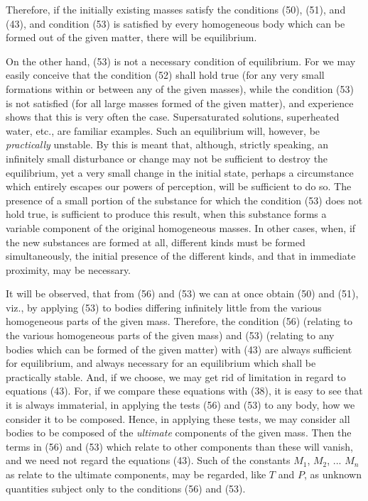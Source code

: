 \documentclass[12pt]{article}
\begin{document}
Therefore, if the initially existing masses satisfy the conditions (50),
(51), and (43), and condition (53) is satisfied by every homogeneous body which can be formed out of the given matter, there will be equilibrium.


On the other hand, (53) is not a necessary condition of equilibrium.
For we may easily conceive that the condition (52) shall hold true (for any very small formations within or between any of the given masses), while the condition (53) is not satisfied (for all large masses formed of the given matter), and experience shows that this is very often the case. Supersaturated solutions, superheated water, etc., are familiar examples. Such an equilibrium will, however, be \textit{practically} unstable. By this is meant that, although, strictly speaking, an infinitely small disturbance or change may not be sufficient to destroy the equilibrium, yet a very small change in the initial state, perhaps a circumstance which entirely escapes our powers of perception, will be sufficient to do so. The presence of a small portion of the substance for which the condition (53) does not hold true, is sufficient to produce this result, when this substance forms a variable component of the original homogeneous masses. In other cases, when, if the new substances are formed at all, different kinds must be formed simultaneously, the initial presence of the different kinds, and that in immediate proximity, may be necessary.


It will be observed, that from (56) and (53) we can at once obtain (50) and (51), viz., by applying (53) to bodies differing infinitely little from the various homogeneous parts of the given mass. Therefore, the condition (56) (relating to the various homogeneous parts of the given mass) and (53) (relating to any bodies which can be formed of the given matter) with (43) are always sufficient for equilibrium, and always necessary for an equilibrium which shall be practically stable. And, if we choose, we may get rid of limitation in regard to equations (43). For, if we compare these equations with (38), it is easy to see that it is always immaterial, in applying the tests (56) and (53) to any body, how we consider it to be composed. Hence, in applying these tests, we may consider all bodies to be composed of the \textit{ultimate} components of the given mass. Then the terms in (56) and (53) which relate to other components than these will vanish, and we need not regard the equations (43). Such of the constants $M_1$, $M_2$, ... $M_n$ as relate to the ultimate components, may be regarded, like $T$ and $P$, as unknown quantities subject only to the conditions (56) and (53).
\end{document}
